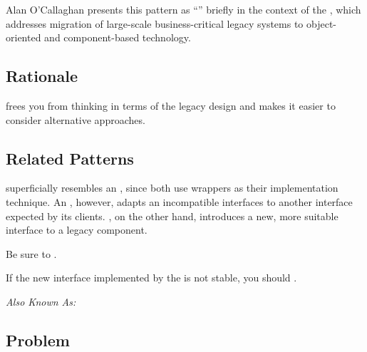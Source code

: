 \documentclass[a4paper,10pt,twoside]{book}
\begin{document}
Alan O'Callaghan \cite{Ocal00a} presents this pattern as ``'' briefly in the context of the , which addresses migration of large-scale business-critical legacy systems to object-oriented and component-based technology. 

\subsection*{Rationale}

 frees you from thinking in terms of the legacy design and makes it easier to consider alternative approaches.

\subsection*{Related Patterns}

 superficially resembles an , since both use wrappers as their implementation technique. An , however, adapts an incompatible interfaces to another interface expected by its clients. , on the other hand, introduces a new, more suitable interface to a legacy component. 

Be sure to . 

If the new interface implemented by the  is not stable, you should .


\emph{Also Known As:}   \cite{Ocal00a}


\subsection*{Problem}
\end{document}
